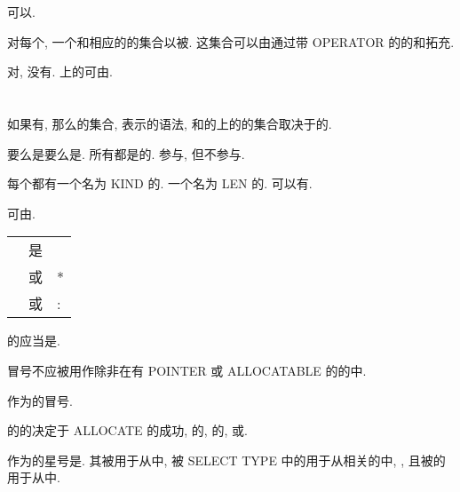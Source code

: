 \Constant{}\Value{}可以\Named{}.

对每个\IntrinsicType{}, 一个\Operation{}和相应的\Operator{}的集合以被\Intrinsically{}\Define{}. 这\Intrinsic{}集合可以由通过带 OPERATOR \Interface{}的\Function{}\Define{}的\Operation{}和\Operator{}拓充.

对\DerivedType{}, 没有\Intrinsic{}\Operation{}. \DerivedType{}上的\Operation{}可由\Program{}\Define{}.

\section{\TypeParameter{}}

如果\Type{}有\TypeParameter{}, 那么\Value{}的集合, 表示\Value{}的语法, 和\Type{}的\Value{}上的\Operation{}的集合取决于\Parameter{}的\Value{}.

\TypeParameter{}要么是\Kind{}\TypeParameter{}要么是\Length{}\TypeParameter{}. 所有\TypeParameter{}都是\IntegerType{}的. \Kind{}\TypeParameter{}参与\Generic{}\Resolution{}, 但\Length{}\TypeParameter{}不参与.

每个\IntrinsicType{}都有一个名为 KIND 的\Kind{}\TypeParameter{}. \IntrinsicType{}\CharacterType{}一个名为 LEN 的\Length{}\TypeParameter{}. \DerivedType{}可以有\TypeParameter{}.

\TypeParameter{}\Value{}可由\Type{}\Specification{}\Specify{}.

\begin{tabular}{lll}
    \tit{\TypeParameter{}\Value{}}&是&\tit{\Scalar{}\IntegerType{}\Expression{}}\\
    &或&*\\
    &或&:\\
\end{tabular}

\Kind{}\TypeParameter{}的\tit{\TypeParameter{}\Value{}}应当是\Constant{}\Expression{}.

冒号不应被用作\tit{\TypeParameter{}\Value{}}除非在有 POINTER 或 ALLOCATABLE \Attribute{}的\Entity{}的\Declaration{}中.

作为\tit{\TypeParameter{}\Value{}}的冒号\Specify{}\DeferredTypeParameter{}.

\Object{}的\DeferredTypeParameter{}的\Value{}决定于 ALLOCATE \Statement{}的成功\Execution{}, \Intrinsic{}\Assignment{}\Statement{}的\Execution{}, \Pointer{}\Assignment{}\Statement{}的\Execution{}, 或\ArgumentAssociation{}.

作为\tit{\TypeParameter{}\Value{}}的星号\Specify{}\Length{}\TypeParameter{}是\AssumedTypeParameter{}. 其被\DummyArgument{}用于从\EffectiveArgument{}中\Assume{}\TypeParameter{}\Value{}, 被 SELECT TYPE \Construct{}中的\AssociateName{}用于从相关的\Selector{}中\Assume{}\TypeParameter{}\Value{}, , 且被\CharacterType{}的\Named{}\Constant{}用于从\tit{\Constant{}\Expression{}}中\Assume{}\Character{}\Length{}.

